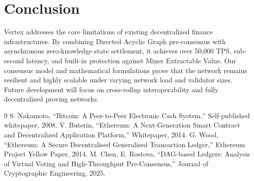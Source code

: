 \section{Conclusion}
Vertex addresses the core limitations of existing decentralized finance infrastructures. By combining Directed Acyclic Graph pre-consensus with asynchronous zero-knowledge state settlement, it achieves over 50,000 TPS, sub-second latency, and built-in protection against Miner Extractable Value. Our consensus model and mathematical formulations prove that the network remains resilient and highly scalable under varying network load and validator sizes. Future development will focus on cross-rollup interoperability and fully decentralized proving networks.

\begin{thebibliography}{9}
S. Nakamoto, ``Bitcoin: A Peer-to-Peer Electronic Cash System,'' Self-published whitepaper, 2008.
V. Buterin, ``Ethereum: A Next-Generation Smart Contract and Decentralized Application Platform,'' Whitepaper, 2014.
G. Wood, ``Ethereum: A Secure Decentralised Generalised Transaction Ledger,'' Ethereum Project Yellow Paper, 2014.
M. Chen, E. Rostova, ``DAG-based Ledgers: Analysis of Virtual Voting and High-Throughput Pre-Consensus,'' Journal of Cryptographic Engineering, 2025.
\end{thebibliography}
